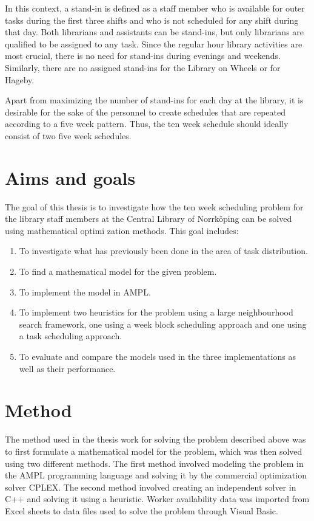 In this context, a stand-in is defined as a staff member who is available for outer tasks during the first three shifts and who is not scheduled for any shift during that day. Both librarians and assistants can be stand-ins, but only librarians are qualified to be assigned to any task. Since the regular hour library activities are most crucial, there is no need for stand-ins during evenings and weekends. Similarly, there are no assigned stand-ins for the Library on Wheels or for Hageby.

Apart from maximizing the number of stand-ins for each day at the library, it is desirable for the sake of the personnel to create schedules that are repeated according to a five week pattern. Thus, the ten week schedule should ideally consist of two five week schedules.

\section{Aims and goals}

The goal of this thesis is to investigate how the ten week scheduling problem for the library staff members at the Central Library of Norrköping can be solved using mathematical optimi zation methods. This goal includes:

\begin{enumerate}
\item To investigate what has previously been done in the area of task distribution.
\item To find a mathematical model for the given problem.
\item To implement the model in AMPL.
\item To implement two heuristics for the problem using a large neighbourhood search framework, one using a week block scheduling approach and one using a task scheduling approach.
\item To evaluate and compare the models used in the three implementations as well as their performance.
\end{enumerate}


\section{Method}
The method used in the thesis work for solving the problem described above was to first formulate a mathematical model for the problem, which was then solved using two different methods. The first method involved modeling the problem in the AMPL programming language and solving it by the commercial optimization solver CPLEX. The second method involved creating an independent solver in C++ and solving it using a heuristic. Worker availability data was imported from Excel sheets to data files used to solve the problem through Visual Basic.

